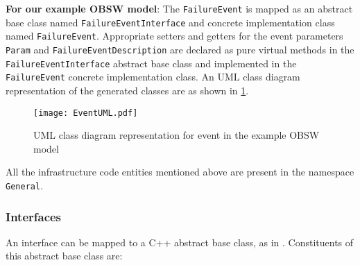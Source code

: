 \textbf{For our example OBSW model}: The \texttt{FailureEvent} is mapped as an abstract base class named \texttt{FailureEvent\allowbreak Interface} and concrete implementation class named \texttt{FailureEvent}. Appropriate setters and getters for the event parameters \texttt{Param} and \texttt{Failure\allowbreak Event\allowbreak	Description} are declared as pure virtual methods in the \texttt{FailureEvent\allowbreak Interface} abstract base class and implemented in the \texttt{FailureEvent} concrete implementation class. An UML class diagram representation of the generated classes are as shown in \cref{fig: EventUML}.

\begin{figure}[h]
	\centering
	\texttt{[image: EventUML.pdf]}
	\caption{UML class diagram representation for event in the example OBSW model}
	\label{fig: EventUML}
\end{figure}    

All the infrastructure code entities mentioned above are present in the namespace \texttt{General}.  

\subsubsection{\textbf{Interfaces}}
An interface can be mapped to a C++ abstract base class, as in \cite{EvoRAVCodeAr}. Constituents of this abstract base class are:

